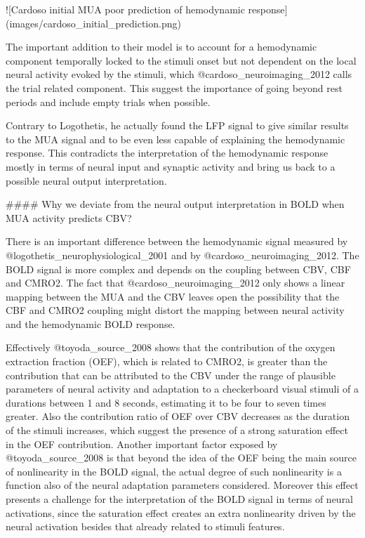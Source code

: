 ![Cardoso initial MUA poor prediction of hemodynamic response](images/cardoso_initial_prediction.png)

The important addition to their model is to account for a hemodynamic component temporally locked to the stimuli onset but not dependent on the local neural activity evoked by the stimuli, which @cardoso_neuroimaging_2012 calls the trial related component. This suggest the importance of going beyond rest periods and include empty trials when possible.

Contrary to Logothetis, he actually found the LFP signal to give similar results to the MUA signal and to be even less capable of explaining the hemodynamic response. This contradicts the interpretation of the hemodynamic response mostly in terms of neural input and synaptic activity and bring us back to a possible neural output interpretation.

#### Why we deviate from the neural output interpretation in BOLD when MUA activity predicts CBV?

There is an important difference between the hemodynamic signal measured by @logothetis_neurophysiological_2001 and by @cardoso_neuroimaging_2012. The BOLD signal is more complex and depends on the coupling between CBV, CBF and CMRO2. The fact that @cardoso_neuroimaging_2012 only shows a linear mapping between the MUA and the CBV leaves open the possibility that the CBF and CMRO2 coupling might distort the mapping between neural activity and the hemodynamic BOLD response.

Effectively @toyoda_source_2008 shows that the contribution of the oxygen extraction fraction (OEF), which is related to CMRO2, is greater than the contribution that can be attributed to the CBV under the range of plausible parameters of neural activity and adaptation to a checkerboard visual stimuli of a durations between 1 and 8 seconds, estimating it to be four to seven times greater. Also the contribution ratio of OEF over CBV decreases as the duration of the stimuli increases, which suggest the presence of a strong saturation effect in the OEF contribution. Another important factor exposed by @toyoda_source_2008 is that beyond the idea of the OEF being the main source of nonlinearity in the BOLD signal, the actual degree of such nonlinearity is a function also of the neural adaptation parameters considered. Moreover this effect presents a challenge for the interpretation of the BOLD signal in terms of neural activations, since the saturation effect creates an extra nonlinearity driven by the neural activation besides that already related to stimuli features.

